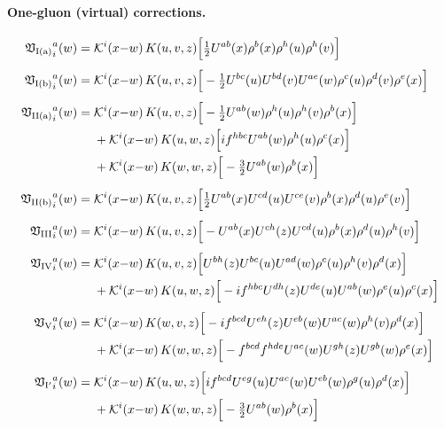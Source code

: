 \documentclass[aps,prd,onecolumn,superscriptaddress,nofootinbib,floatfix,longbibliography,11pt]{revtex4-2}
\numberwithin{equation}{section}
\newcommand{\KK}{\mathcal{K}}
\begin{document}
\paragraph*{One-gluon (virtual) corrections.}
{\small
\begin{align}
{\mathfrak V_{\rm I(a)}}^{a}_{i}(w)=\;&\KK^{i}(x{-}w)\,K(u,v,z)\Big[\tfrac{1}{2}U^{ab}(x)\rho^{b}(x)\rho^{h}(u)\rho^{h}(v)\Big]\label{eq:LLT1TI_Nafter}
\\[4pt]
{\mathfrak V_{\rm I(b)}}^{a}_{i}(w)=\;&\KK^{i}(x{-}w)\,K(u,v,z)\Big[-\tfrac{1}{2}U^{bc}(u)U^{bd}(v)U^{ae}(w)\rho^{c}(u)\rho^{d}(v)\rho^{e}(x)\Big]\label{eq:LLT1TI_Nbarbefore}
\\[4pt]
{\mathfrak V_{\rm II(a)}}^{a}_{i}(w)=\;&\KK^{i}(x{-}w)\,K(u,v,z)\Big[-\tfrac{1}{2}U^{ab}(w)\rho^{h}(u)\rho^{h}(v)\rho^{b}(x)\Big]\notag\\
&+\KK^{i}(x{-}w)\,K(u,w,z)\Big[if^{hbc}U^{ab}(w)\rho^{h}(u)\rho^{c}(x)\Big]\notag\\
&+\KK^{i}(x{-}w)\,K(w,w,z)\Big[-\tfrac{3}{2}U^{ab}(w)\rho^{b}(x)\Big]\label{eq:LLT1TII_A3}
\\[4pt]
{\mathfrak V_{\rm II(b)}}^{a}_{i}(w)=\;&\KK^{i}(x{-}w)\,K(u,v,z)\Big[\tfrac{1}{2}U^{ab}(x)U^{cd}(u)U^{ce}(v)\rho^{b}(x)\rho^{d}(u)\rho^{e}(v)\Big]\label{eq:LLT1TII_A3bar}
\\[4pt]
{\mathfrak V_{\rm III}}^{a}_{i}(w)=\;&\KK^{i}(x{-}w)\,K(u,v,z)\Big[-U^{ab}(x)U^{ch}(z)U^{cd}(u)\rho^{b}(x)\rho^{d}(u)\rho^{h}(v)\Big]\label{eq:LLT1TIII}
\\[4pt]
{\mathfrak V_{\rm IV}}^{a}_{i}(w)=\;&\KK^{i}(x{-}w)\,K(u,v,z)\Big[U^{bh}(z)U^{bc}(u)U^{ad}(w)\rho^{c}(u)\rho^{h}(v)\rho^{d}(x)\Big]\notag\\
&+\KK^{i}(x{-}w)\,K(u,w,z)\Big[-if^{hbc}U^{dh}(z)U^{de}(u)U^{ab}(w)\rho^{e}(u)\rho^{c}(x)\Big]\label{eq:LLT1TIV}
\\[4pt]
{\mathfrak V_{\rm V}}^{a}_{i}(w)=\;&\KK^{i}(x{-}w)\,K(w,v,z)\Big[-if^{bcd}U^{eh}(z)U^{eb}(w)U^{ac}(w)\rho^{h}(v)\rho^{d}(x)\Big]\notag\\
&+\KK^{i}(x{-}w)\,K(w,w,z)\Big[-f^{bcd}f^{hde}U^{ac}(w)U^{gh}(z)U^{gb}(w)\rho^{e}(x)\Big]\label{eq:LLT1TV}
\\[4pt]
{\mathfrak V_{\rm I'}}^{a}_{i}(w)=\;&\KK^{i}(x{-}w)\,K(u,w,z)\Big[if^{bcd}U^{eg}(u)U^{ac}(w)U^{eb}(w)\rho^{g}(u)\rho^{d}(x)\Big]\notag\\
&+\KK^{i}(x{-}w)\,K(w,w,z)\Big[-\tfrac{3}{2}U^{ab}(w)\rho^{b}(x)\Big]\label{eq:LLT1TIa}
\end{align}
}
\end{document}
